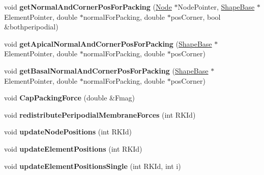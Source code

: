 \begin{DoxyCompactItemize}
\item 
\hypertarget{classSimulation_a93325d2848bfe281bff7c373ad369f86}{}void {\bfseries get\+Normal\+And\+Corner\+Pos\+For\+Packing} (\hyperlink{classNode}{Node} $\ast$Node\+Pointer, \hyperlink{classShapeBase}{Shape\+Base} $\ast$Element\+Pointer, double $\ast$normal\+For\+Packing, double $\ast$pos\+Corner, bool \&bothperipodial)\label{classSimulation_a93325d2848bfe281bff7c373ad369f86}

\item 
\hypertarget{classSimulation_a532ee0b0d6b016b898391fc7188187cc}{}void {\bfseries get\+Apical\+Normal\+And\+Corner\+Pos\+For\+Packing} (\hyperlink{classShapeBase}{Shape\+Base} $\ast$Element\+Pointer, double $\ast$normal\+For\+Packing, double $\ast$pos\+Corner)\label{classSimulation_a532ee0b0d6b016b898391fc7188187cc}

\item 
\hypertarget{classSimulation_a80ed7a37c28be0fd5bdbd097e4b44344}{}void {\bfseries get\+Basal\+Normal\+And\+Corner\+Pos\+For\+Packing} (\hyperlink{classShapeBase}{Shape\+Base} $\ast$Element\+Pointer, double $\ast$normal\+For\+Packing, double $\ast$pos\+Corner)\label{classSimulation_a80ed7a37c28be0fd5bdbd097e4b44344}

\item 
\hypertarget{classSimulation_a33120f358a608cf6ede1a45715a8f990}{}void {\bfseries Cap\+Packing\+Force} (double \&Fmag)\label{classSimulation_a33120f358a608cf6ede1a45715a8f990}

\item 
\hypertarget{classSimulation_a0f2aafedd2ceaab7ef60b9493aa98b21}{}void {\bfseries redistribute\+Peripodial\+Membrane\+Forces} (int R\+K\+Id)\label{classSimulation_a0f2aafedd2ceaab7ef60b9493aa98b21}

\item 
\hypertarget{classSimulation_a90c07716cd9ffe3b4c48babf77eb8904}{}void {\bfseries update\+Node\+Positions} (int R\+K\+Id)\label{classSimulation_a90c07716cd9ffe3b4c48babf77eb8904}

\item 
\hypertarget{classSimulation_a73aeedfc61d7edda6a2999eff57990d6}{}void {\bfseries update\+Element\+Positions} (int R\+K\+Id)\label{classSimulation_a73aeedfc61d7edda6a2999eff57990d6}

\item 
\hypertarget{classSimulation_ac82de4f0b4cda6575e1258068fe3cd42}{}void {\bfseries update\+Element\+Positions\+Single} (int R\+K\+Id, int i)\label{classSimulation_ac82de4f0b4cda6575e1258068fe3cd42}


\end{DoxyCompactItemize}
